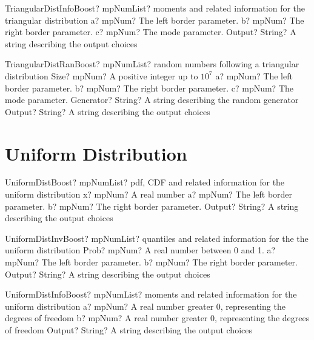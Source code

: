 \documentclass[12pt,a4paper,openany]{book}
\begin{document}
\begin{mpFunctionsExtract}
\mpFunctionFourNotImplemented
{TriangularDistInfoBoost? mpNumList? moments and related information for the triangular distribution}
{a? mpNum? The left border parameter.}
{b? mpNum? The right border parameter.}
{c? mpNum? The mode parameter.}
{Output? String? A string describing the output choices}
\end{mpFunctionsExtract}

\begin{mpFunctionsExtract}
\mpFunctionSixNotImplemented
{TriangularDistRanBoost? mpNumList? random numbers following a triangular distribution}
{Size? mpNum? A positive integer up to $10^7$}
{a? mpNum? The left border parameter.}
{b? mpNum? The right border parameter.}
{c? mpNum? The mode parameter.}
{Generator? String? A string describing the random generator}
{Output? String? A string describing the output choices}
\end{mpFunctionsExtract}

\section{Uniform Distribution}

\begin{mpFunctionsExtract}
\mpFunctionFourNotImplemented
{UniformDistBoost? mpNumList? pdf, CDF and related information for the uniform distribution}
{x? mpNum? A real number}
{a? mpNum? The left border parameter.}
{b? mpNum? The right border parameter.}
{Output? String? A string describing the output choices}
\end{mpFunctionsExtract}

\begin{mpFunctionsExtract}
\mpFunctionFourNotImplemented
{UniformDistInvBoost? mpNumList? quantiles and related information for the the uniform distribution}
{Prob? mpNum? A real number between 0 and 1.}
{a? mpNum? The left border parameter.}
{b? mpNum? The right border parameter.}
{Output? String? A string describing the output choices}
\end{mpFunctionsExtract}

\begin{mpFunctionsExtract}
\mpFunctionThreeNotImplemented
{UniformDistInfoBoost? mpNumList? moments and related information for the uniform distribution}
{a? mpNum? A real number greater 0, representing the degrees of freedom}
{b? mpNum? A real number greater 0, representing the degrees of freedom}
{Output? String? A string describing the output choices}
\end{mpFunctionsExtract}
\end{document}
